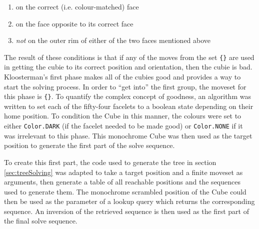 \documentclass{report}
\newcommand{\tit}[1]{\textit{#1}}
\newcommand{\moveset}[1]{\uppercase{\texttt{\{\formatmoves{#1}\}}}}
\begin{document}
	\begin{enumerate}
		\item[] on the correct (i.e. colour-matched) face
		\item[] on the face opposite to its correct face
		\item[] \tit{not} on the outer rim of either of the two faces mentioned above
	\end{enumerate}

	The result of these conditions is that if any of the moves from the set \moveset{u.u'd.d@} are used in getting the cubie to its correct position and orientation, then the cubie is bad. Kloosterman's first phase makes all of the cubies good and provides a way to start the solving process. In order to \enquote{get into} the first group, the moveset for this phase is \moveset{u'd'l'r'f'b@}. To quantify the complex concept of goodness, an algorithm was written to set each of the fifty-four facelets to a boolean state depending on their home position. To condition the Cube in this manner, the colours were set to either \lstinline|Color.DARK| (if the facelet needed to be made good) or \lstinline|Color.NONE| if it was irrelevant to this phase. This monochrome Cube was then used as the target position to generate the first part of the solve sequence.
	
	To create this first part, the code used to generate the tree in section \ref{sec:treeSolving} was adapted to take a target position and a finite moveset as arguments, then generate a table of all reachable positions and the sequences used to generate them. The monochrome scrambled position of the Cube could then be used as the parameter of a lookup query which returns the corresponding sequence. An inversion of the retrieved sequence is then used as the first part of the final solve sequence.
	
\end{document}
